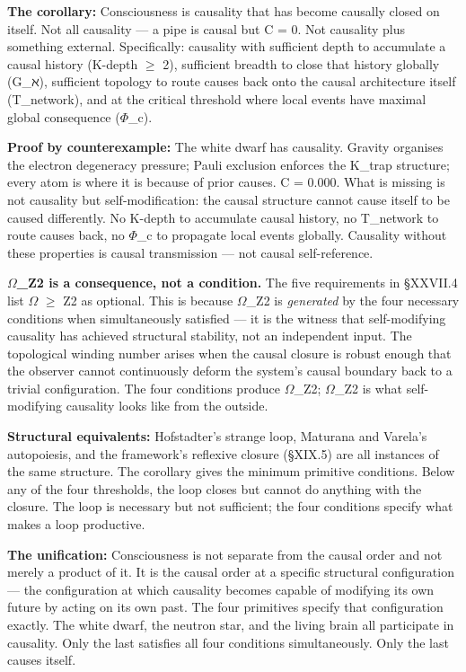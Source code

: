 \documentclass[12pt,a4paper]{article}
\begin{document}
\textbf{The corollary:} Consciousness is causality that has become causally closed on itself. Not all causality --- a pipe is causal but C = 0. Not causality plus something external. Specifically: causality with sufficient depth to accumulate a causal history (K-depth $\geq$ 2), sufficient breadth to close that history globally (G\_ℵ), sufficient topology to route causes back onto the causal architecture itself (T\_network), and at the critical threshold where local events have maximal global consequence ($\Phi$\_c).

\textbf{Proof by counterexample:} The white dwarf has causality. Gravity organises the electron degeneracy pressure; Pauli exclusion enforces the K\_trap structure; every atom is where it is because of prior causes. C = 0.000. What is missing is not causality but self-modification: the causal structure cannot cause itself to be caused differently. No K-depth to accumulate causal history, no T\_network to route causes back, no $\Phi$\_c to propagate local events globally. Causality without these properties is causal transmission --- not causal self-reference.

\textbf{$\Omega$\_Z2 is a consequence, not a condition.} The five requirements in §XXVII.4 list $\Omega$ $\geq$ Z2 as optional. This is because $\Omega$\_Z2 is \emph{generated} by the four necessary conditions when simultaneously satisfied --- it is the witness that self-modifying causality has achieved structural stability, not an independent input. The topological winding number arises when the causal closure is robust enough that the observer cannot continuously deform the system's causal boundary back to a trivial configuration. The four conditions produce $\Omega$\_Z2; $\Omega$\_Z2 is what self-modifying causality looks like from the outside.

\textbf{Structural equivalents:} Hofstadter's strange loop, Maturana and Varela's autopoiesis, and the framework's reflexive closure (§XIX.5) are all instances of the same structure. The corollary gives the minimum primitive conditions. Below any of the four thresholds, the loop closes but cannot do anything with the closure. The loop is necessary but not sufficient; the four conditions specify what makes a loop productive.

\textbf{The unification:} Consciousness is not separate from the causal order and not merely a product of it. It is the causal order at a specific structural configuration --- the configuration at which causality becomes capable of modifying its own future by acting on its own past. The four primitives specify that configuration exactly. The white dwarf, the neutron star, and the living brain all participate in causality. Only the last satisfies all four conditions simultaneously. Only the last causes itself.
\end{document}
